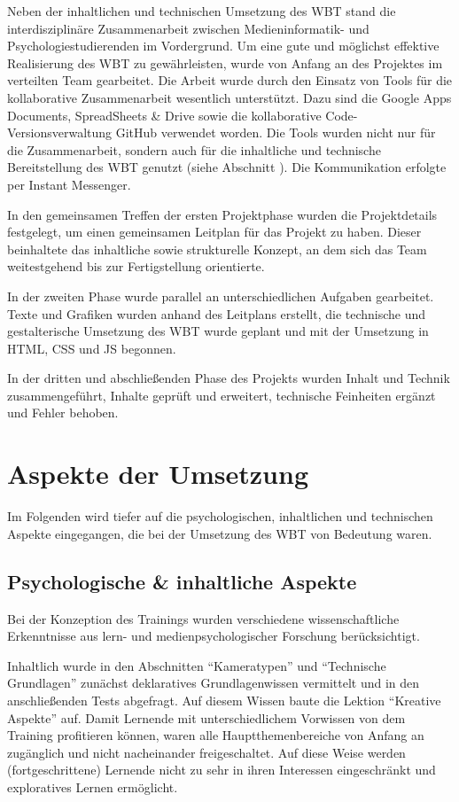 \documentclass{article}
\begin{document}
Neben der inhaltlichen und technischen Umsetzung des WBT stand die interdisziplin\"are Zusammenarbeit zwischen Medieninformatik- und Psychologiestudierenden im Vordergrund. Um eine gute und m\"oglichst effektive Realisierung des WBT zu gew\"ahrleisten, wurde von Anfang an des Projektes im verteilten Team gearbeitet. Die Arbeit wurde durch den Einsatz von Tools f\"ur die kollaborative Zusammenarbeit wesentlich unterst\"utzt. Dazu sind die Google\textsuperscript{\textcopyright} Apps Documents, SpreadSheets \& Drive sowie die kollaborative Code-Versionsverwaltung GitHub verwendet worden. Die Tools wurden nicht nur f\"ur die Zusammenarbeit, sondern auch f\"ur die inhaltliche und technische Bereitstellung des WBT genutzt (siehe Abschnitt ). Die Kommunikation erfolgte per Instant Messenger.

In den gemeinsamen Treffen der ersten Projektphase wurden die Projektdetails festgelegt, um einen gemeinsamen Leitplan f\"ur das Projekt zu haben. Dieser beinhaltete das inhaltliche sowie strukturelle Konzept, an dem sich das Team weitestgehend bis zur Fertigstellung orientierte.

In der zweiten Phase wurde parallel an unterschiedlichen Aufgaben gearbeitet. Texte und Grafiken wurden anhand des Leitplans erstellt, die technische und gestalterische Umsetzung des WBT wurde geplant und mit der Umsetzung in HTML, CSS und JS begonnen.

In der dritten und abschlie{\ss}enden Phase des Projekts wurden Inhalt und Technik zusammengef\"uhrt, Inhalte gepr\"uft und erweitert, technische Feinheiten erg\"anzt und Fehler behoben.

\section{Aspekte der Umsetzung}
\label{sec:umsetzung}
Im Folgenden wird tiefer auf die psychologischen, inhaltlichen und technischen Aspekte eingegangen, die bei der Umsetzung des WBT von Bedeutung waren. 

\subsection{Psychologische \& inhaltliche Aspekte}
\label{ssec:psy}
Bei der Konzeption des Trainings wurden verschiedene wissenschaftliche Erkenntnisse aus lern- und medienpsychologischer Forschung ber\"ucksichtigt.

Inhaltlich wurde in den Abschnitten ``Kameratypen'' und ``Technische Grundlagen'' zun\"achst deklaratives Grundlagenwissen vermittelt und in den anschlie{\ss}enden Tests abgefragt. Auf diesem Wissen baute die Lektion ``Kreative Aspekte'' auf. Damit Lernende mit unterschiedlichem Vorwissen von dem Training profitieren k\"onnen, waren alle Hauptthemenbereiche von Anfang an zug\"anglich und nicht nacheinander freigeschaltet. Auf diese Weise werden (fortgeschrittene) Lernende nicht zu sehr in ihren Interessen eingeschr\"ankt und exploratives Lernen erm\"oglicht.
\end{document}
